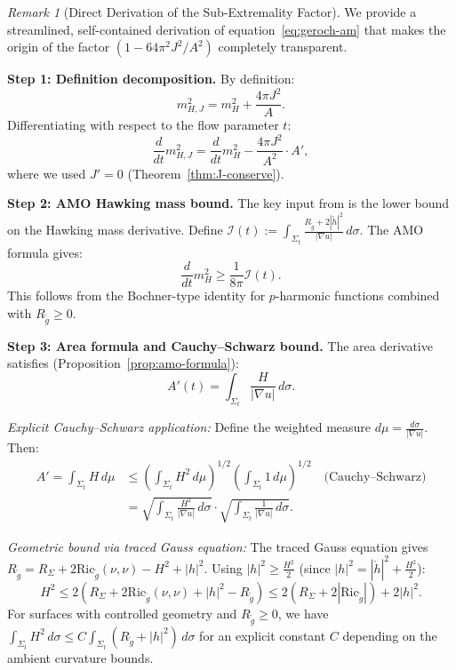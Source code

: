 \documentclass[12pt]{article}
\theoremstyle{plain}
\theoremstyle{definition}
\theoremstyle{remark}
\newtheorem{remark}[theorem]{Remark}
\newcommand{\Ric}{\mathrm{Ric}}
\newcommand{\tg}{\tilde{g}}
\begin{document}
\begin{remark}[Direct Derivation of the Sub-Extremality Factor]\label{rem:subext-derivation}
We provide a streamlined, self-contained derivation of equation~\eqref{eq:geroch-am} that makes the origin of the factor $(1 - 64\pi^2 J^2/A^2)$ completely transparent.

\textbf{Step 1: Definition decomposition.} By definition:
\[
m_{H,J}^2 = m_H^2 + \frac{4\pi J^2}{A}.
\]
Differentiating with respect to the flow parameter $t$:
\begin{equation}\label{eq:mHJ-deriv-direct}
\frac{d}{dt}m_{H,J}^2 = \frac{d}{dt}m_H^2 - \frac{4\pi J^2}{A^2} \cdot A',
\end{equation}
where we used $J' = 0$ (Theorem~\ref{thm:J-conserve}).

\textbf{Step 2: AMO Hawking mass bound.} The key input from \cite{amo2022} is the lower bound on the Hawking mass derivative. Define $\mathcal{I}(t) := \int_{\Sigma_t} \frac{R_{\tg} + 2|\mathring{h}|^2}{|\nabla u|}\, d\sigma$. The AMO formula gives:
\begin{equation}\label{eq:mH-lower-amo}
\frac{d}{dt}m_H^2 \geq \frac{1}{8\pi}\mathcal{I}(t).
\end{equation}
This follows from the Bochner-type identity for $p$-harmonic functions combined with $R_{\tg} \geq 0$.

\textbf{Step 3: Area formula and Cauchy--Schwarz bound.} The area derivative satisfies (Proposition~\ref{prop:amo-formula}):
\[
A'(t) = \int_{\Sigma_t} \frac{H}{|\nabla u|}\, d\sigma.
\]

\textit{Explicit Cauchy--Schwarz application:} Define the weighted measure $d\mu = \frac{d\sigma}{|\nabla u|}$. Then:
\begin{align}
A' = \int_{\Sigma_t} H \, d\mu &\leq \left(\int_{\Sigma_t} H^2 \, d\mu\right)^{1/2} \left(\int_{\Sigma_t} 1 \, d\mu\right)^{1/2} \quad \text{(Cauchy--Schwarz)} \\
&= \sqrt{\int_{\Sigma_t} \frac{H^2}{|\nabla u|}\, d\sigma} \cdot \sqrt{\int_{\Sigma_t} \frac{1}{|\nabla u|}\, d\sigma}.
\end{align}

\textit{Geometric bound via traced Gauss equation:} The traced Gauss equation gives $R_{\tg} = R_\Sigma + 2\Ric_{\tg}(\nu,\nu) - H^2 + |h|^2$. Using $|h|^2 \geq \frac{H^2}{2}$ (since $|h|^2 = |\mathring{h}|^2 + \frac{H^2}{2}$):
\[
H^2 \leq 2(R_\Sigma + 2\Ric_{\tg}(\nu,\nu) + |h|^2 - R_{\tg}) \leq 2(R_\Sigma + 2|\Ric_{\tg}|) + 2|h|^2.
\]
For surfaces with controlled geometry and $R_{\tg} \geq 0$, we have $\int_{\Sigma_t} H^2 \, d\sigma \leq C \int_{\Sigma_t} (R_{\tg} + |h|^2)\, d\sigma$ for an explicit constant $C$ depending on the ambient curvature bounds.


\end{remark}
\end{document}
